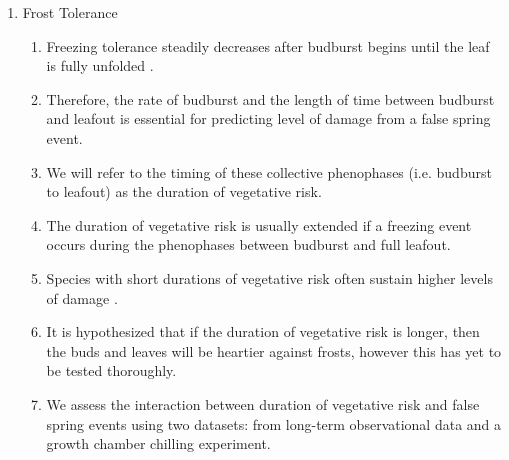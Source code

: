 \documentclass{article}\usepackage[]{graphicx}\usepackage[]{color}
\begin{document}
\begin{enumerate}
\item Frost Tolerance
\begin{enumerate}
\item Freezing tolerance steadily decreases after budburst begins until the leaf is fully unfolded \citep{Lenz2016}.
\item Therefore, the rate of budburst and the length of time between budburst and leafout is essential for predicting level of damage from a false spring event.
\item We will refer to the timing of these collective phenophases (i.e. budburst to leafout) as the duration of vegetative risk.
\item The duration of vegetative risk is usually extended if a freezing event occurs during the phenophases between budburst and full leafout.
\item Species with short durations of vegetative risk often sustain higher levels of damage \citep {Augspurger2009}.
\item It is hypothesized that if the duration of vegetative risk is longer, then the buds and leaves will be heartier against frosts, however this has yet to be tested thoroughly.
\item We assess the interaction between duration of vegetative risk and false spring events using two datasets: from long-term observational data and a growth chamber chilling experiment.
\end {enumerate}




\end{enumerate}
\end{document}
